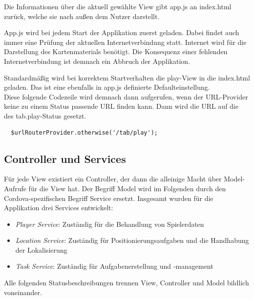 Die Informationen über die aktuell gewählte View gibt app.js an index.html zurück, welche sie nach außen dem Nutzer darstellt.


App.js wird bei jedem Start der Applikation zuerst geladen. Dabei findet auch immer eine Prüfung der aktuellen Internetverbindung statt. Internet wird für die Darstellung des Kartenmaterials benötigt. Die Konsequenz einer fehlenden Internetverbindung ist demnach ein Abbruch der Applikation.


Standardmäßig wird bei korrektem Startverhalten die play-View in die index.html geladen. Das ist eine ebenfalls in app.js definierte Defaulteinstellung.
\\
Diese folgende Codezeile wird demnach dann aufgerufen, wenn der URL-Provider keine zu einem Status passende URL finden kann. Dann wird die URL auf die des tab.play-Status gesetzt.
\begin{lstlisting}
  $urlRouterProvider.otherwise('/tab/play');
\end{lstlisting}

\subsection{Controller und Services}
Für jede View existiert ein Controller, der dann die alleinige Macht über Model-Aufrufe für die View hat. Der Begriff Model wird im Folgenden durch den Cordova-spezifischen Begriff Service ersetzt. Insgesamt wurden für die Applikation drei Services entwickelt:
\begin{itemize}
\item \emph{Player Service}: Zuständig für die Behandlung von Spielerdaten
\item \emph{Location Service}: Zuständig für Positionierungsaufgaben und die Handhabung der Lokalisierung
\item \emph{Task Service}: Zuständig für Aufgabenerstellung und -management
\end{itemize}
Alle folgenden Statusbeschreibungen trennen View, Controller und Model bildlich voneinander.
\\
